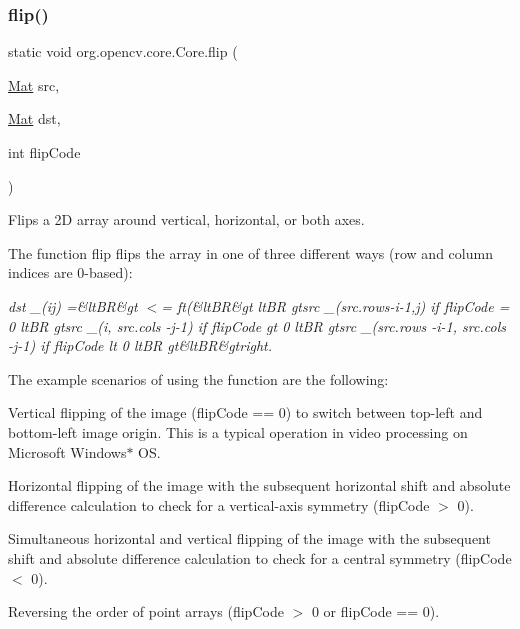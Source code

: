 \mbox{\label{classorg_1_1opencv_1_1core_1_1_core_a8dc68bbfca84b4fdfb9cd7bd79fc893e}} 
\subsubsection{\texorpdfstring{flip()}{flip()}}
{\footnotesize\ttfamily static void org.\+opencv.\+core.\+Core.\+flip (\begin{DoxyParamCaption}\item[{\mbox{\hyperlink{classorg_1_1opencv_1_1core_1_1_mat}{Mat}}}]{src,  }\item[{\mbox{\hyperlink{classorg_1_1opencv_1_1core_1_1_mat}{Mat}}}]{dst,  }\item[{int}]{flip\+Code }\end{DoxyParamCaption})\hspace{0.3cm}{\ttfamily [static]}}

Flips a 2D array around vertical, horizontal, or both axes.

The function {\ttfamily flip} flips the array in one of three different ways (row and column indices are 0-\/based)\+:

{\itshape dst \+\_\+(ij) =\&lt\+BR\&gt $<$= ft(\&lt\+BR\&gt lt\+BR gtsrc \+\_\+(src.\+rows-\/i-\/1,j) if flip\+Code = 0 lt\+BR gtsrc \+\_\+(i, src.\+cols -\/j-\/1) if flip\+Code gt 0 lt\+BR gtsrc \+\_\+(src.\+rows -\/i-\/1, src.\+cols -\/j-\/1) if flip\+Code lt 0 lt\+BR gt\&lt\+BR\&gtright.}

The example scenarios of using the function are the following\+:


\begin{DoxyItemize}
\item Vertical flipping of the image ({\ttfamily flip\+Code == 0}) to switch between top-\/left and bottom-\/left image origin. This is a typical operation in video processing on Microsoft Windows$\ast$ OS. 
\item Horizontal flipping of the image with the subsequent horizontal shift and absolute difference calculation to check for a vertical-\/axis symmetry ({\ttfamily flip\+Code $>$ 0}). 
\item Simultaneous horizontal and vertical flipping of the image with the subsequent shift and absolute difference calculation to check for a central symmetry ({\ttfamily flip\+Code $<$ 0}). 
\item Reversing the order of point arrays ({\ttfamily flip\+Code $>$ 0} or {\ttfamily flip\+Code == 0}). 
\end{DoxyItemize}



